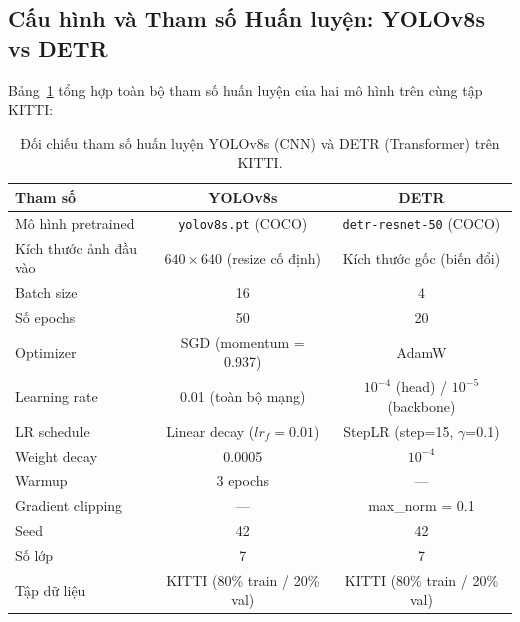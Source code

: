 \subsection{Cấu hình và Tham số Huấn luyện: YOLOv8s vs DETR}

Bảng~\ref{tab:cnn-transformer-params} tổng hợp toàn bộ tham số huấn luyện của hai mô hình trên cùng tập KITTI:

\begin{table}[H]
\centering
\caption{Đối chiếu tham số huấn luyện YOLOv8s (CNN) và DETR (Transformer) trên KITTI.}
\label{tab:cnn-transformer-params}
\begin{tabular}{|l|c|c|}
\hline
\textbf{Tham số} & \textbf{YOLOv8s} & \textbf{DETR} \\
\hline
Mô hình pretrained & \texttt{yolov8s.pt} (COCO) & \texttt{detr-resnet-50} (COCO) \\
\hline
Kích thước ảnh đầu vào & $640 \times 640$ (resize cố định) & Kích thước gốc (biến đổi) \\
\hline
Batch size & 16 & 4 \\
\hline
Số epochs & 50 & 20 \\
\hline
Optimizer & SGD (momentum = 0.937) & AdamW \\
\hline
Learning rate & 0.01 (toàn bộ mạng) & $10^{-4}$ (head) / $10^{-5}$ (backbone) \\
\hline
LR schedule & Linear decay ($lr_f = 0.01$) & StepLR (step=15, $\gamma$=0.1) \\
\hline
Weight decay & 0.0005 & $10^{-4}$ \\
\hline
Warmup & 3 epochs & --- \\
\hline
Gradient clipping & --- & max\_norm = 0.1 \\
\hline
Seed & 42 & 42 \\
\hline
Số lớp & 7 & 7 \\
\hline
Tập dữ liệu & KITTI (80\% train / 20\% val) & KITTI (80\% train / 20\% val) \\
\hline
\end{tabular}
\end{table}

